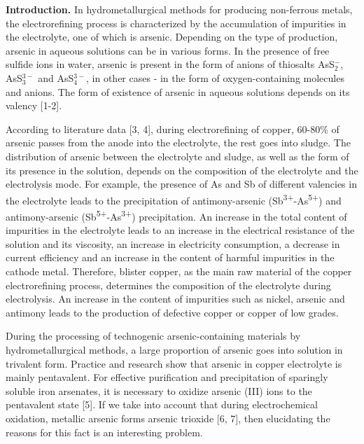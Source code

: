 \begin{multicols}{2}
{\bfseries Introduction.} In hydrometallurgical methods for producing
non-ferrous metals, the electrorefining process is characterized by the
accumulation of impurities in the electrolyte, one of which is arsenic.
Depending on the type of production, arsenic in aqueous solutions can be
in various forms. In the presence of free sulfide ions in water, arsenic
is present in the form of anions of thiosalts
AsS$^-_2$,
AsS$^{3-}_3$ and
AsS$^{3-}_4$, in other cases - in the form of
oxygen-containing molecules and anions. The form of existence of arsenic
in aqueous solutions depends on its valency {[}1-2{]}.

According to literature data {[}3, 4{]}, during electrorefining of
copper, 60-80\% of arsenic passes from the anode into the electrolyte,
the rest goes into sludge. The distribution of arsenic between the
electrolyte and sludge, as well as the form of its presence in the
solution, depends on the composition of the electrolyte and the
electrolysis mode. For example, the presence of As and Sb of different
valencies in the electrolyte leads to the precipitation of
antimony-arsenic (Sb\textsuperscript{3+}-As\textsuperscript{5+}) and
antimony-arsenic (Sb\textsuperscript{5+}-As\textsuperscript{3+})
precipitation. An increase in the total content of impurities in the
electrolyte leads to an increase in the electrical resistance of the
solution and its viscosity, an increase in electricity consumption, a
decrease in current efficiency and an increase in the content of harmful
impurities in the cathode metal. Therefore, blister copper, as the main
raw material of the copper electrorefining process, determines the
composition of the electrolyte during electrolysis. An increase in the
content of impurities such as nickel, arsenic and antimony leads to the
production of defective copper or copper of low grades.

During the processing of technogenic arsenic-containing materials by
hydrometallurgical methods, a large proportion of arsenic goes into
solution in trivalent form. Practice and research show that arsenic in
copper electrolyte is mainly pentavalent. For effective purification and
precipitation of sparingly soluble iron arsenates, it is necessary to
oxidize arsenic (III) ions to the pentavalent state {[}5{]}. If we take
into account that during electrochemical oxidation, metallic arsenic
forms arsenic trioxide {[}6, 7{]}, then elucidating the reasons for this
fact is an interesting problem.


\end{multicols}
